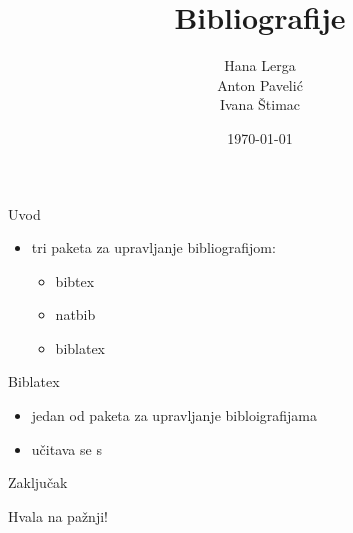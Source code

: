 \documentclass{beamer}
\begin{document}
\title{Bibliografije}
\date{\today}
\author{Hana Lerga \\ Anton Pavelić \\ Ivana Štimac}

\begin{frame}
\maketitle
\end{frame}

\begin{frame}
\tableofcontents
\end{frame}


\begin{frame}{Uvod}
\begin{itemize}
	\item tri paketa za upravljanje bibliografijom:\\
	\begin{itemize}
		\item bibtex \\
		\item natbib \\
		\item biblatex \\
	\end{itemize}
\end{itemize}
	
\end{frame}

\begin{frame}{Biblatex}
\begin{itemize}
	\item jedan od paketa za upravljanje bibloigrafijama \\
	\item učitava se s 
\end{itemize}
\end{frame}

\begin{frame}{Zaključak}
\end{frame}

\begin{frame}
Hvala na pažnji!
\end{frame}
\end{document}

